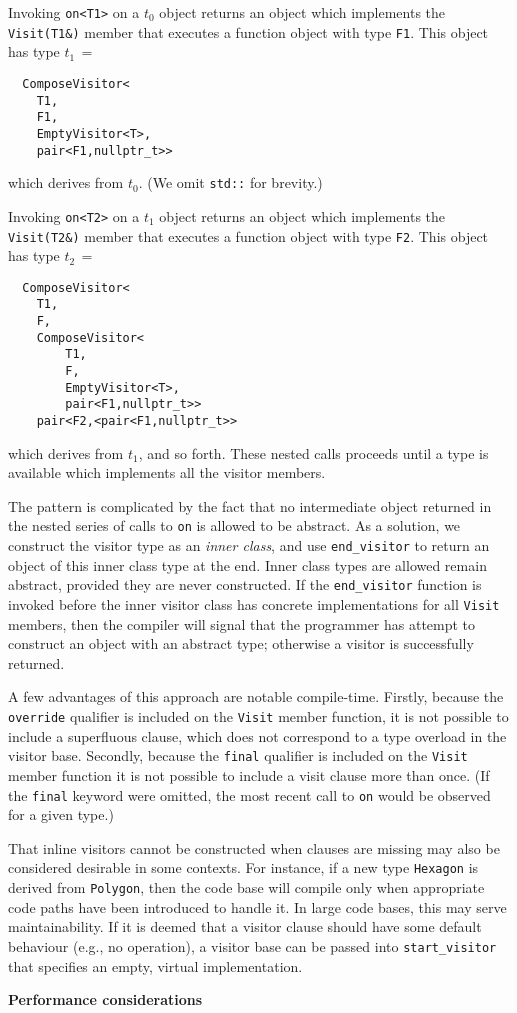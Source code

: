 \documentclass[10pt,a4paper,twocolumn]{article}
\renewcommand\section[1]{
    \begin{minipage}[c]{0.94\linewidth}
    \large \raggedright \sffamily \textbf{#1}
    \end{minipage}
}
\newcommand\mycode[1]{{\small\texttt{#1}}}
\begin{document}
Invoking \mycode{on<T1>} on a $t_0$ object returns an object which implements the \mycode{Visit(T1\&)} member that executes a function object with type \mycode{F1}. This object has type $t_1\, =$
{\small\begin{verbatim}
  ComposeVisitor<
    T1,
    F1,
    EmptyVisitor<T>,
    pair<F1,nullptr_t>>
\end{verbatim}}
which derives from $t_0$. (We omit \mycode{std::} for brevity.)

Invoking \mycode{on<T2>} on a $t_1$ object returns an object which implements the \mycode{Visit(T2\&)} member that executes a function object with type \mycode{F2}. This object has type $t_2\, =$
{\small\begin{verbatim}
  ComposeVisitor<
    T1,
    F,
    ComposeVisitor<
        T1,
        F,
        EmptyVisitor<T>,
        pair<F1,nullptr_t>>
    pair<F2,<pair<F1,nullptr_t>>
\end{verbatim}}
which derives from $t_1$, and so forth. These nested calls proceeds until a type is available which implements all the visitor members.

The pattern is complicated by the fact that no intermediate object returned in the nested series of calls to \mycode{on} is allowed to be abstract. As a solution, we construct the visitor type as an \emph{inner class}, and use \mycode{end\_visitor} to return an object of this inner class type at the end. Inner class types are allowed remain abstract, provided they are never constructed. If the \mycode{end\_visitor} function is invoked before the inner visitor class has concrete implementations for all \mycode{Visit} members, then the compiler will signal that the programmer has attempt to construct an object with an abstract type; otherwise a visitor is successfully returned.

A few advantages of this approach are notable compile-time. Firstly, because the \mycode{override} qualifier is included on the \mycode{Visit} member function, it is not possible to include a superfluous clause, which does not correspond to a type overload in the visitor base. Secondly, because the \mycode{final} qualifier is included on the \mycode{Visit} member function it is not possible to include a visit clause more than once. (If the \mycode{final} keyword were omitted, the most recent call to \mycode{on} would be observed for a given type.)

That inline visitors cannot be constructed when clauses are missing may also be considered desirable in some contexts. For instance, if a new type \mycode{Hexagon} is derived from \mycode{Polygon}, then the code base will compile only when appropriate code paths have been introduced to handle it. In large code bases, this may serve maintainability. If it is deemed that a visitor clause should have some default behaviour (e.g., no operation), a visitor base can be passed into \mycode{start\_visitor} that specifies an empty, virtual implementation.

\section{Performance considerations}
\end{document}
